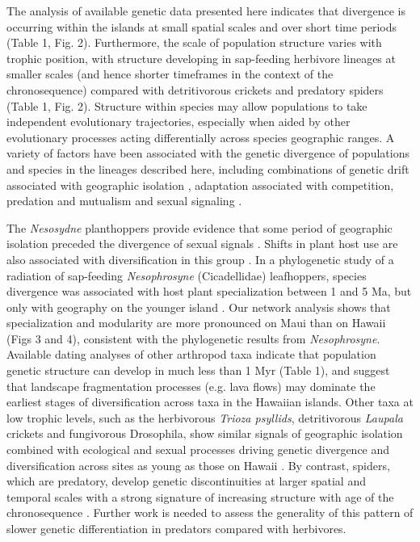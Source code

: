 The analysis of available genetic data presented here indicates that
divergence is occurring within the islands at small spatial scales and
over short time periods (Table 1, Fig. 2). Furthermore, the scale of
population structure varies with trophic position, with structure
developing in sap-feeding herbivore lineages at smaller scales (and
hence shorter timeframes in the context of the chronosequence)
compared with detritivorous crickets and predatory spiders (Table 1,
Fig. 2). Structure within species may allow populations to take
independent evolutionary trajectories, especially when aided by other
evolutionary processes acting differentially across species geographic
ranges. A variety of factors have been associated with the genetic
divergence of populations and species in the lineages described here,
including combinations of genetic drift associated with geographic
isolation \citep{percy2003, mendelson2005, ogrady2011, goodman2012},
adaptation associated with competition, predation and mutualism
\citep{gillespie2004, roderick2008, brewer2015} and sexual signaling
\citep{mendelson2005, percy2006, magnacca2008, goodman2015}.

The \textit{Nesosydne} planthoppers provide evidence that some period
of geographic isolation preceded the divergence of sexual signals
\citep{goodman2012, goodman2015}. Shifts in plant host use are also
associated with diversification in this group \citep{roderick2008}. In
a phylogenetic study of a radiation of sap-feeding
\textit{Nesophrosyne} (Cicadellidae) leafhoppers, species divergence
was associated with host plant specialization between 1 and 5 Ma, but
only with geography on the younger island \citep{bennett2013}. Our
network analysis shows that specialization and modularity are more
pronounced on Maui than on Hawaii (Figs 3 and 4), consistent with the
phylogenetic results from \textit{Nesophrosyne}. Available dating
analyses of other arthropod taxa indicate that population genetic
structure can develop in much less than 1 Myr (Table 1), and suggest
that landscape fragmentation processes (e.g. lava flows) may dominate
the earliest stages of diversification across taxa in the Hawaiian
islands. Other taxa at low trophic levels, such as the herbivorous
\textit{Trioza psyllids}, detritivorous \textit{Laupala} crickets and
fungivorous Drosophila, show similar signals of geographic isolation
combined with ecological and sexual processes driving genetic
divergence and diversification across sites as young as those on
Hawaii \citep{percy2003, mendelson2005, percy2006, magnacca2008,
  ogrady2011}. By contrast, spiders, which are predatory, develop
genetic discontinuities at larger spatial and temporal scales with a
strong signature of increasing structure with age of the
chronosequence \citep[][Table 1]{roderick2012}. Further work is needed
to assess the generality of this pattern of slower genetic
differentiation in predators compared with herbivores.


